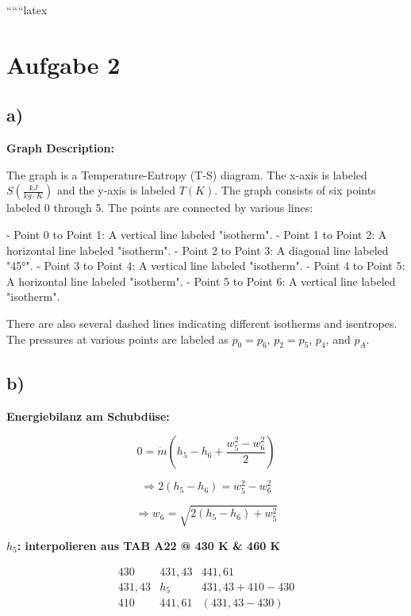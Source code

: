 
``````latex


\section*{Aufgabe 2}

\subsection*{a)}

\begin{center}
\textbf{Graph Description:}

The graph is a Temperature-Entropy (T-S) diagram. The x-axis is labeled $S \left(\frac{kJ}{kg \cdot K}\right)$ and the y-axis is labeled $T (K)$. The graph consists of six points labeled 0 through 5. The points are connected by various lines:

- Point 0 to Point 1: A vertical line labeled "isotherm".
- Point 1 to Point 2: A horizontal line labeled "isotherm".
- Point 2 to Point 3: A diagonal line labeled "45°".
- Point 3 to Point 4: A vertical line labeled "isotherm".
- Point 4 to Point 5: A horizontal line labeled "isotherm".
- Point 5 to Point 6: A vertical line labeled "isotherm".

There are also several dashed lines indicating different isotherms and isentropes. The pressures at various points are labeled as $p_0 = p_6$, $p_2 = p_5$, $p_4$, and $p_A$.

\end{center}

\subsection*{b)}

\textbf{Energiebilanz am Schubdüse:}

\[
0 = \dot{m} \left( h_5 - h_6 + \frac{w_5^2 - w_6^2}{2} \right)
\]

\[
\Rightarrow 2(h_5 - h_6) = w_5^2 - w_6^2
\]

\[
\Rightarrow w_6 = \sqrt{2(h_5 - h_6) + w_5^2}
\]

\textbf{$h_5$: interpolieren aus TAB A22 @ 430 K \& 460 K}

\[
\begin{array}{ccc}
430 & 431,43 & 441,61 \\
431,43 & h_5 & 431,43 + 410 - 430 \\
410 & 441,61 & (431,43 - 430) \\
\end{array}
\]

